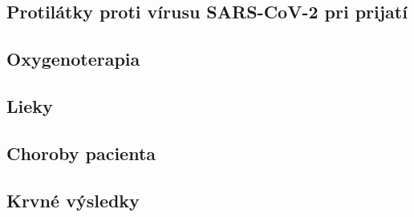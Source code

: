 \subsection{Protilátky proti vírusu SARS-CoV-2 pri prijatí}

\subsection{Oxygenoterapia}

\subsection{Lieky}

\subsection{Choroby pacienta}

\subsection{Krvné výsledky}